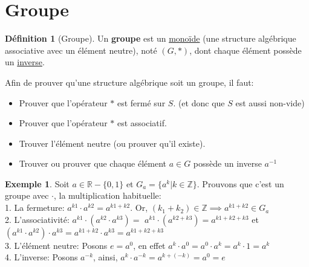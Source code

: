 \documentclass[12pt]{book}
\let\Bbb\mathbb
\def\sep{\phantom{}}
\theoremstyle{definition}
\newtheorem{definition}{Définition}[section]
\newtheorem*{example}{Exemple}
\begin{document}
\section{Groupe}
\begin{definition}[Groupe]
    \label{def:groupe}
    Un \textbf{groupe} est un \hyperref[def:monoide]{monoïde} (une structure algébrique associative avec un élément neutre), noté $(G, \ast)$, dont chaque élément possède un \hyperref[def:inverse]{inverse}.
\end{definition}
Afin de prouver qu'une structure algébrique soit un groupe, il faut:
\begin{itemize}
    \item Prouver que l'opérateur $\ast$ est fermé sur $S$. (et donc que $S$ est aussi non-vide)
    \item Prouver que l'opérateur $\ast$ est associatif.
    \item Trouver l'élément neutre (ou prouver qu'il existe).
    \item Trouver ou prouver que chaque élément $a \in G$ possède un inverse $a^{-1}$
\end{itemize}
\begin{example}
    Soit $a \in \Bbb R - \{0, 1\}$ et $G_a = \{a^k | k \in \Bbb Z\}$. Prouvons que c'est un groupe avec $\cdot$, la multiplication habituelle: \sep \\
    1. La fermeture: $a^{k1} \cdot a^{k2} = a^{k1 + k2}$. Or, $(k_1 + k_2) \in \Bbb Z \implies a^{k1 + k2} \in G_a$ \sep \\
    2. L'associativité: $a^{k1} \cdot (a^{k2} \cdot a^{k3}) =$ \sep 
    $a^{k1} \cdot (a^{k2 + k3}) = a^{k1 + k2 + k3}$ et \sep 
    $(a^{k1} \cdot a^{k2}) \cdot a^{k3} = a^{k1 + k2} \cdot a^{k3} = a^{k1 + k2 + k3}$ \sep \\
    3. L'élément neutre: Posons $e = a^0$, en effet $a^k \cdot a^0 = a^0 \cdot a^k = a^k \cdot 1 = a^k$ \sep \\
    4. L'inverse: Posons $a^{-k}$, ainsi, $a^k \cdot a^{-k} = a^{k + (-k)} = a^0 = e$ 
\end{example}
\end{document}
